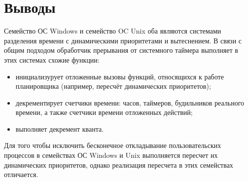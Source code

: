 \documentclass[a4paper, 12pt]{extreport}
\begin{document}
\chapter{Выводы}

Семейство ОС Windows и семейство OC Unix оба являются системами разделения времени с динамическими приоритетами и вытеснением. В связи с общим подходом обработчик прерывания от системного таймера выполняет в этих системах схожие функции: 

\begin{itemize}
	\item инициализурует отложенные вызовы функций, относящихся к работе планировщика (например, пересчёт динамических приоритетов);
	\item декрементирует счетчики времени: часов, таймеров, будильников реального времени, а также счетчики времени отложенных действий;
	\item выполняет декремент кванта.
\end{itemize}

Для того чтобы исключить бесконечное откладывание пользовательских процессов в семействах ОС Windows и Unix 
выполняется пересчет их динамических приоритетов, однако реализация пересчета в этих семействах отличается. 
\end{document}
